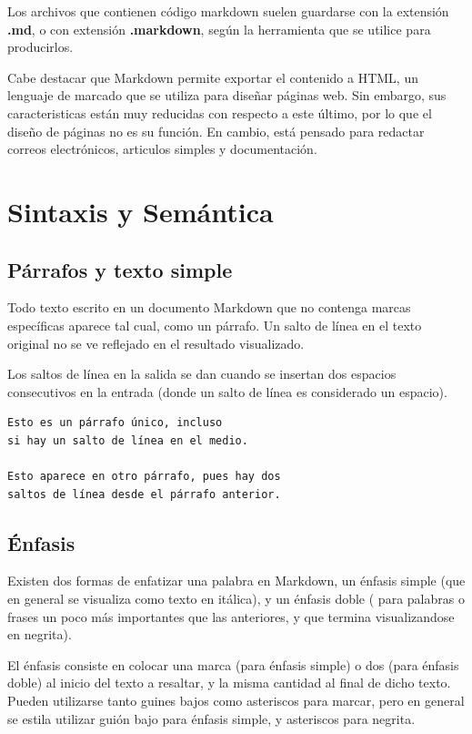 Los archivos que contienen código markdown suelen guardarse con la extensión
\textbf{.md}, o con extensión \textbf{.markdown}, según la herramienta que se
utilice para producirlos.

Cabe destacar que Markdown permite exportar el contenido a HTML, un lenguaje
de marcado que se utiliza para diseñar páginas web. Sin embargo, sus caracteristicas
están muy reducidas con respecto a este último, por lo que el diseño de páginas
no es su función. En cambio, está pensado para redactar correos electrónicos,
articulos simples y documentación.

\section{Sintaxis y Semántica}

\subsection*{Párrafos y texto simple}

Todo texto escrito en un documento Markdown que no contenga marcas específicas
aparece tal cual, como un párrafo. Un salto de línea en el texto original
no se ve reflejado en el resultado visualizado.

Los saltos de línea en la salida se dan cuando se insertan dos espacios
consecutivos en la entrada (donde un salto de línea es considerado un espacio).

\begin{lstlisting}[language=Markdown]
Esto es un párrafo único, incluso
si hay un salto de línea en el medio.

Esto aparece en otro párrafo, pues hay dos
saltos de línea desde el párrafo anterior.
\end{lstlisting}

\subsection*{Énfasis}

Existen dos formas de enfatizar una palabra en Markdown, un énfasis simple
(que en general se visualiza como texto en itálica), y un énfasis doble (
para palabras o frases un poco más importantes que las anteriores, y que
termina visualizandose en negrita).

El énfasis consiste en colocar una marca (para énfasis simple) o dos (para énfasis
doble) al inicio del texto a resaltar, y la misma cantidad al final de dicho texto.
Pueden utilizarse tanto guines bajos como asteriscos para marcar, pero en general
se estila utilizar guión bajo para énfasis simple, y asteriscos para negrita.

